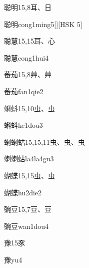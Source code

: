 \begin{entry}{聪明}{15,8}{⽿、⽇}
  \begin{phonetics}{聪明}{cong1ming5}[][HSK 5]
  \end{phonetics}
\end{entry}

\begin{entry}{聪慧}{15,15}{⽿、⼼}
  \begin{phonetics}{聪慧}{cong1hui4}
  \end{phonetics}
\end{entry}

\begin{entry}{蕃茄}{15,8}{⾋、⾋}
  \begin{phonetics}{蕃茄}{fan1qie2}
  \end{phonetics}
\end{entry}

\begin{entry}{蝌蚪}{15,10}{⾍、⾍}
  \begin{phonetics}{蝌蚪}{ke1dou3}
  \end{phonetics}
\end{entry}

\begin{entry}{蝲蝲蛄}{15,15,11}{⾍、⾍、⾍}
  \begin{phonetics}{蝲蝲蛄}{la4la4gu3}
  \end{phonetics}
\end{entry}

\begin{entry}{蝴蝶}{15,15}{⾍、⾍}
  \begin{phonetics}{蝴蝶}{hu2die2}
  \end{phonetics}
\end{entry}

\begin{entry}{豌豆}{15,7}{⾖、⾖}
  \begin{phonetics}{豌豆}{wan1dou4}
  \end{phonetics}
\end{entry}

\begin{entry}{豫}{15}{⾗}
  \begin{phonetics}{豫}{yu4}
  \end{phonetics}
\end{entry}

